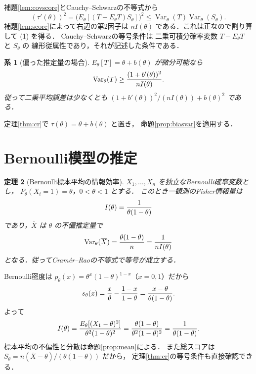 \documentclass[a5paper,10pt,onecolumn]{jsarticle}
\makeatletter
\theoremstyle{mathnotetheorem}
\newtheorem{theorem}{定理}[section]
\newtheorem{corollary}[theorem]{系}
\renewcommand{\proofname}{証明}
\renewenvironment{proof}[1][\proofname]{%
  \par\pushQED{\qed}\normalfont\topsep4\p@\@plus2\p@\relax
  \trivlist\item[\hskip\labelsep\bfseries #1]\ignorespaces
}{\popQED\endtrivlist\@endpefalse}
\makeatother
\begin{document}
\begin{proof}
補題\ref{lem:covscore}とCauchy--Schwarzの不等式から
\[
 (\tau'(\theta))^2
 =\bigl(E_\theta[(T-E_\theta T)S_\theta]\bigr)^2
 \le\operatorname{Var}_\theta(T)
       \operatorname{Var}_\theta(S_\theta).
\]
補題\ref{lem:score}によって右辺の第2因子は
$nI(\theta)$ である．これは正なので割り算して (1) を得る．
Cauchy--Schwarzの等号条件は
二乗可積分確率変数 $T-E_\theta T$ と $S_\theta$ の
線形従属性であり，それが記述した条件である．
\end{proof}
\begin{corollary}[偏った推定量の場合]
$E_\theta[T]=\theta+b(\theta)$ が微分可能なら
\[
 \operatorname{Var}_\theta(T)
 \ge {(1+b'(\theta))^2\over nI(\theta)}.
\]
従って二乗平均誤差は少なくとも
$(1+b'(\theta))^2/(nI(\theta))+b(\theta)^2$ である．
\end{corollary}
\begin{proof}
定理\ref{thm:cr}で
$\tau(\theta)=\theta+b(\theta)$ と置き，
命題\ref{prop:biasvar}を適用する．
\end{proof}

\section{Bernoulli模型の推定}
\begin{theorem}[Bernoulli標本平均の情報効率]
$X_1,\ldots,X_n$ を独立なBernoulli確率変数とし，
$P_\theta(X_i=1)=\theta$，$0<\theta<1$ とする．
このとき一観測のFisher情報量は
\[
 I(\theta)={1\over\theta(1-\theta)}
\]
であり，$\overline X$ は $\theta$ の不偏推定量で
\[
 \operatorname{Var}_\theta(\overline X)
 ={\theta(1-\theta)\over n}
 ={1\over nI(\theta)}
\]
となる．従ってCram\'er--Raoの不等式で等号が成立する．
\end{theorem}
\begin{proof}
Bernoulli密度は
$p_\theta(x)=\theta^x(1-\theta)^{1-x}$（$x=0,1$）だから
\[
 s_\theta(x)={x\over\theta}-{1-x\over1-\theta}
 ={x-\theta\over\theta(1-\theta)}.
\]
よって
\[
 I(\theta)
 ={E_\theta[(X_1-\theta)^2]\over
   \theta^2(1-\theta)^2}
 ={\theta(1-\theta)\over
   \theta^2(1-\theta)^2}
 ={1\over\theta(1-\theta)}.
\]
標本平均の不偏性と分散は命題\ref{prop:mean}による．
また総スコアは
$S_\theta=n(\overline X-\theta)/
 (\theta(1-\theta))$ だから，
定理\ref{thm:cr}の等号条件も直接確認できる．
\end{proof}
\end{document}

